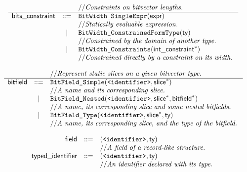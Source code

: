 \documentclass{book}
\begin{document}
\[
\begin{array}{rcl}
& & // \textit{Constraints on bitvector lengths.}\ \\
\hline
\textsf{bits\_constraint} &::=& \texttt{BitWidth\_SingleExpr}(\textsf{expr}) \\
  & & // \textit{Statically evaluable expression.}\ \\
  &|& \texttt{BitWidth\_ConstrainedFormType}(\textsf{ty}) \\
  & & // \textit{Constrained by the domain of another type.}\ \\
  &|& \texttt{BitWidth\_Constraints}(\textsf{int\_constraint}^{*}) \\
  & & // \textit{Constrained directly by a constraint on its width.}\ \\
\end{array}
\]

\[
\begin{array}{rcl}
& & // \textit{Represent static slices on a given bitvector type.}\ \\
\hline
\textsf{bitfield} &::=& \texttt{BitField\_Simple}(\texttt{<identifier>}, \textsf{slice}^{*}) \\
  & & // \textit{A name and its corresponding slice.}\ \\
  &|& \texttt{BitField\_Nested}(\texttt{<identifier>}, \textsf{slice}^{*}, \textsf{bitfield}^{*}) \\
  & & // \textit{A name, its corresponding slice and some nested bitfields.}\ \\
  &|& \texttt{BitField\_Type}(\texttt{<identifier>}, \textsf{slice}^{*}, \textsf{ty}) \\
  & & // \textit{A name, its corresponding slice, and the type of the bitfield.}\ \\
\end{array}
\]

\[
\begin{array}{rcl}
\textsf{field} &::=& (\texttt{<identifier>}, \textsf{ty})\\
  & & // \textit{A field of a record-like structure.}\ \\
\textsf{typed\_identifier} &::=& (\texttt{<identifier>}, \textsf{ty})\\
  & & // \textit{An identifier declared with its type.}\ \\
\end{array}
\]
\end{document}
